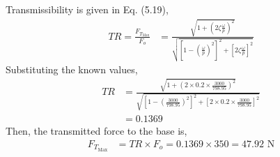 \subsection{}
Transmissibility is given in Eq. (5.19),
\begin{align*}
    TR = \frac{F_{T_{\text{Max}}}}{F_o} &= \frac{\sqrt{1 + (2\zeta \frac{\omega}{p})^2}}{\sqrt{\left[1 - \left(\frac{\omega}{p} \right)^2 \right]^2 + \left[2 \zeta \frac{\omega}{p} \right]^2}} 
\end{align*}
Substituting the known values,
\begin{align*}
    TR &= \frac{\sqrt{1 + (2 \times 0.2 \times \frac{3000}{798.95})^2}}{\sqrt{\left[1 - \left(\frac{3000}{798.95} \right)^2 \right]^2 + \left[2 \times 0.2 \times \frac{3000}{798.95} \right]^2}} \\
    &= \boxed{0.1369}
\end{align*}
Then, the transmitted force to the base is,
\begin{align*}
    F_{T_{\text{Max}}} &= TR \times F_o = 0.1369 \times 350 = \boxed{47.92 \text{ N}}
\end{align*}
